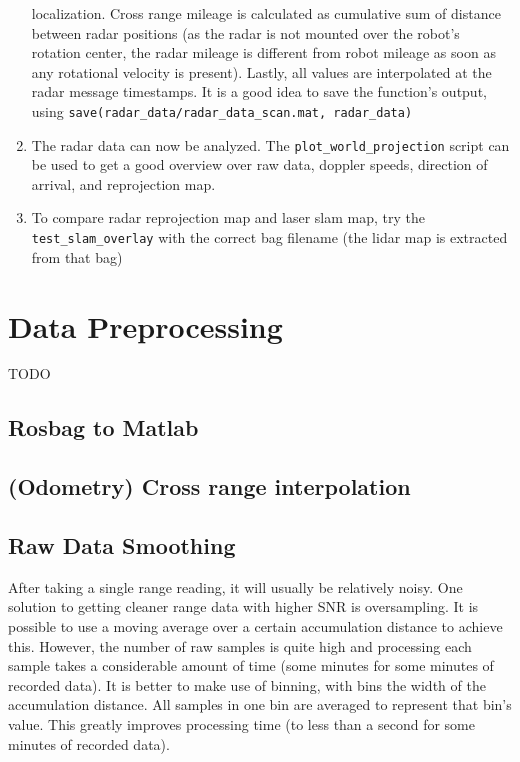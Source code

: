\begin{enumerate}
  localization. Cross range mileage is calculated as cumulative sum of
  distance between radar positions (as the radar is not mounted over the
  robot's rotation center, the radar mileage is different from robot
  mileage as soon as any rotational velocity is present). Lastly, all
  values are interpolated at the radar message timestamps. It is a good
  idea to save the function's output, using
  \texttt{save(\textquotesingle{}radar\_data/radar\_data\_scan.mat\textquotesingle{},\ \textquotesingle{}radar\_data\textquotesingle{})}
\item
  The radar data can now be analyzed. The
  \texttt{plot\_world\_projection} script can be used to get a good
  overview over raw data, doppler speeds, direction of arrival, and
  reprojection map.
\item
  To compare radar reprojection map and laser slam map, try the
  \texttt{test\_slam\_overlay} with the correct bag filename (the lidar
  map is extracted from that bag)
\end{enumerate}

\section{Data Preprocessing}\label{data-preprocessing}

TODO

\subsection{Rosbag to Matlab}\label{rosbag-to-matlab}

\subsection{(Odometry) Cross range
interpolation}\label{odometry-cross-range-interpolation}

\subsection{Raw Data Smoothing}\label{raw-data-smoothing}

After taking a single range reading, it will usually be relatively
noisy. One solution to getting cleaner range data with higher SNR is
oversampling. It is possible to use a moving average over a certain
accumulation distance to achieve this. However, the number of raw
samples is quite high and processing each sample takes a considerable
amount of time (some minutes for some minutes of recorded data). It is
better to make use of binning, with bins the width of the accumulation
distance. All samples in one bin are averaged to represent that bin's
value. This greatly improves processing time (to less than a second for
some minutes of recorded data).

